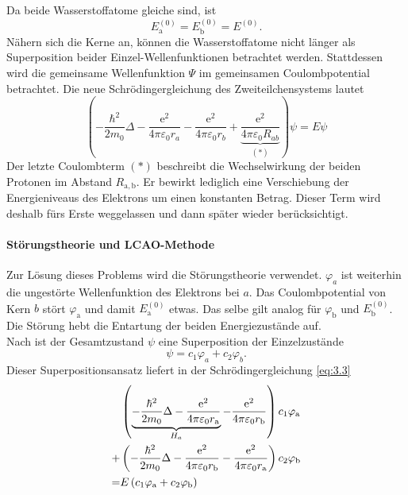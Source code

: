     Da beide Wasserstoffatome gleiche sind, ist
    \begin{equation}
        \label{eq:3.2}
        E_\mathrm{a}^{(0)} = E_\mathrm{b}^{(0)} = E^{(0)}.
    \end{equation}
    Nähern sich die Kerne an, können die Wasserstoffatome nicht länger als Superposition beider Einzel-Wellenfunktionen betrachtet werden.
    Stattdessen wird die gemeinsame Wellenfunktion $\Psi$ im gemeinsamen Coulombpotential betrachtet. Die neue Schrödingergleichung des Zweiteilchensystems lautet
    \begin{equation}
        \label{eq:3.3}
        \left( - \frac{\hbar ^2}{2 m_0} \Delta - \frac{\mathrm{e}^2}{4 \pi \varepsilon_0 r_{a}} -\frac{\mathrm{e}^2}{4 \pi \varepsilon_0 r_{b}} + \underbrace{\frac{\mathrm{e}^2}{4 \pi \varepsilon_0 R_{ab}}}_{(*)} \right) \psi = E \psi
    \end{equation}
    Der letzte Coulombterm $(*)$ beschreibt die Wechselwirkung der beiden Protonen im Abstand $R_\mathrm{a,b}$.
    Er bewirkt lediglich eine Verschiebung der Energieniveaus des Elektrons um einen konstanten Betrag. 
    Dieser Term wird deshalb fürs Erste weggelassen und dann später wieder berücksichtigt.\\

    \paragraph{Störungstheorie und LCAO-Methode}
    Zur Lösung dieses Problems wird die {Störungstheorie} verwendet. 
    $\varphi_a$ ist weiterhin die ungestörte Wellenfunktion des Elektrons bei $a$.
    Das Coulombpotential von Kern $b$ stört $ \varphi_\text{a} $ und damit $E_\text{a}^{(0)}$ etwas. 
    Das selbe gilt analog für $ \varphi_\text{b}$ und $E^{(0)}_\text{b}$. 
    Die Störung hebt die Entartung der beiden Energiezustände auf.\\

    Nach  ist der Gesamtzustand $\psi$ eine Superposition der Einzelzustände
    \begin{equation}
        \label{eq:3.4}
        \psi = c_1 \varphi_{a} + c_2 \varphi_{b}.
    \end{equation}
    Dieser Superpositionsansatz liefert in der Schrödingergleichung \eqref{eq:3.3}
    \begin{equation}
        \label{eq:3.5}
        \begin{aligned}	
        &\left( \underbrace{- \frac{\hbar ^2}{2 m_0} \Delta - \frac{\mathrm{e}^2}{4 \pi \varepsilon_0 r_\text{a}}}_{H_{a}} - \frac{\mathrm{e}^2}{4 \pi \varepsilon_0 r_\text{b}} \right) c_1 \varphi_\text{a} \\ 
            +& \left( - \frac{\hbar ^2}{2 m_0} \Delta - \frac{\mathrm{e}^2}{4\pi \varepsilon_0 r_\text{b}} - \frac{\mathrm{e}^2}{4 \pi \varepsilon_0 r_\text{a}} \right) c_2 \varphi_\text b\\
            =& E \left( c_1 \varphi_\text{a}+ c_2 \varphi_\text{b} \right) 
        \end{aligned}
    \end{equation}


